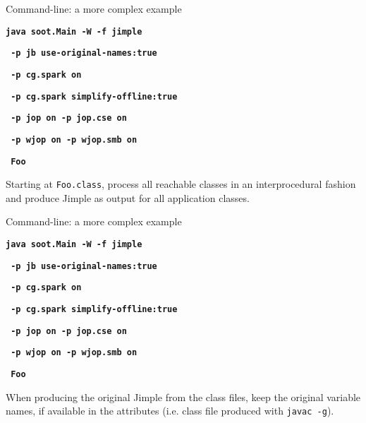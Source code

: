 \begin{slide}{Command-line: a more complex example}

\begin{small}
\textbf{\red\texttt{java soot.Main -W -f jimple}}

\textbf{\texttt{     -p jb use-original-names:true }}

\textbf{\texttt{     -p cg.spark on }}

\textbf{\texttt{     -p cg.spark simplify-offline:true}}

\textbf{\texttt{     -p jop on -p jop.cse on   }}

\textbf{\texttt{     -p wjop on  -p wjop.smb on }}

\textbf{\red\texttt{     Foo }}
\end{small}

\vspace{.2in}

Starting at \texttt{Foo.class}, process all reachable classes in an
interprocedural fashion and produce Jimple as output for all application
classes.   
\end{slide}


\begin{slide}{Command-line: a more complex example}

\begin{small}
\textbf{\texttt{java soot.Main -W -f jimple}}

\textbf{\red\texttt{     -p jb use-original-names:true }}

\textbf{\texttt{     -p cg.spark on }}

\textbf{\texttt{     -p cg.spark simplify-offline:true}}

\textbf{\texttt{     -p jop on -p jop.cse on   }}

\textbf{\texttt{     -p wjop on  -p wjop.smb on }}

\textbf{\texttt{     Foo }}
\end{small}

\vspace{.2in}

When producing
the original Jimple from the class files, 
keep the original variable names, if available in the 
attributes (i.e. class file produced with \texttt{javac -g}).

\end{slide}


